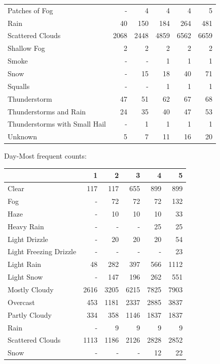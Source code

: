 \documentclass[11pt]{scrartcl}
\begin{document}
\begin{tabular}{lrrrrr}
Patches of Fog                &   - &     4 &     4 &      4 &      5 \\
Rain                          &    40 &   150 &   184 &    264 &    481 \\
Scattered Clouds              &  2068 &  2448 &  4859 &   6562 &   6659 \\
Shallow Fog                   &     2 &     2 &     2 &      2 &      2 \\
Smoke                         &   - &   - &     1 &      1 &      1 \\
Snow                          &   - &    15 &    18 &     40 &     71 \\
Squalls                       &   - &   - &     1 &      1 &      1 \\
Thunderstorm                  &    47 &    51 &    62 &     67 &     68 \\
Thunderstorms and Rain        &    24 &    35 &    40 &     47 &     53 \\
Thunderstorms with Small Hail &   - &     1 &     1 &      1 &      1 \\
Unknown                       &     5 &     7 &    11 &     16 &     20 \\
\bottomrule
\end{tabular}


Day-Most frequent counts:
\begin{tabular}{lrrrrr}
\toprule
{} &     1 &     2 &     3 &     4 &     5 \\
\midrule
Clear                  &   117 &   117 &   655 &   899 &   899 \\
Fog                    &   - &    72 &    72 &    72 &   132 \\
Haze                   &   - &    10 &    10 &    10 &    33 \\
Heavy Rain             &   - &   - &   - &    25 &    25 \\
Light Drizzle          &   - &    20 &    20 &    20 &    54 \\
Light Freezing Drizzle &   - &   - &   - &   - &    23 \\
Light Rain             &    48 &   282 &   397 &   566 &  1112 \\
Light Snow             &   - &   147 &   196 &   262 &   551 \\
Mostly Cloudy          &  2616 &  3205 &  6215 &  7825 &  7903 \\
Overcast               &   453 &  1181 &  2337 &  2885 &  3837 \\
Partly Cloudy          &   334 &   358 &  1146 &  1837 &  1837 \\
Rain                   &   - &     9 &     9 &     9 &     9 \\
Scattered Clouds       &  1113 &  1186 &  2126 &  2828 &  2852 \\
Snow                   &   - &   - &   - &    12 &    22 \\
\bottomrule
\end{tabular}
\end{document}
